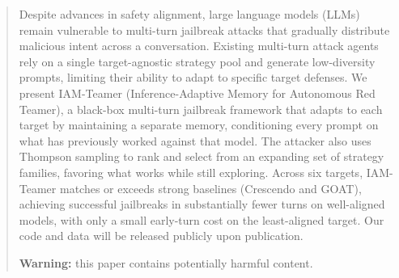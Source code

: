 \begin{abstract}
      Despite advances in safety alignment, large language models (LLMs) remain vulnerable to multi-turn jailbreak attacks that gradually distribute malicious intent across a conversation.
      Existing multi-turn attack agents rely on a single target-agnostic strategy pool and generate low-diversity prompts, limiting their ability to adapt to specific target defenses.
      We present IAM-Teamer (Inference-Adaptive Memory for Autonomous Red Teamer), a black-box multi-turn jailbreak framework that adapts to each target by maintaining a separate memory, conditioning every prompt on what has previously worked against that model.
      The attacker also uses Thompson sampling to rank and select from an expanding set of strategy families, favoring what works while still exploring.
      Across six targets, IAM-Teamer matches or exceeds strong baselines (Crescendo and GOAT), achieving successful jailbreaks in substantially fewer turns on well-aligned models, with only a small early-turn cost on the least-aligned target.
      Our code and data will be released publicly upon publication.

      \smallskip
      \noindent\textbf{Warning:} this paper contains potentially harmful content.

\end{abstract}
